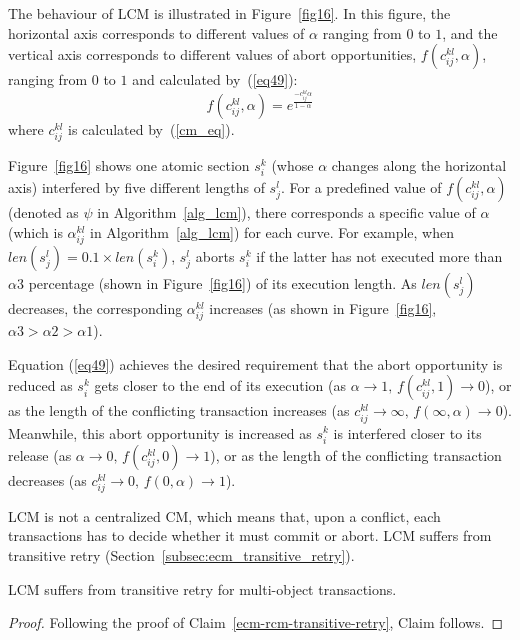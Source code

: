 The behaviour of LCM is illustrated in Figure~\ref{fig16}. In this figure, the horizontal axis corresponds to different values of $\alpha$ ranging from $0$ to $1$, and the vertical axis corresponds to different values of abort opportunities, $f(c_{ij}^{kl},\alpha)$, ranging from $0$ to $1$ and calculated by~(\ref{eq49}):
\begin{equation}
f(c_{ij}^{kl},\alpha)=e^{\frac{-c_{ij}^{kl}\alpha}{1-\alpha}}
\label{eq49}\end{equation}
where $c_{ij}^{kl}$ is calculated by~(\ref{cm_eq}).

Figure~\ref{fig16} shows one atomic section $s_i^k$ (whose $\alpha$ changes along the horizontal axis) interfered by five different lengths of $s_j^l$.
For a predefined value of $f(c_{ij}^{kl},\alpha)$ (denoted as $\psi$ in Algorithm~\ref{alg_lcm}), there corresponds a specific value of $\alpha$ (which is $\alpha_{ij}^{kl}$ in Algorithm~\ref{alg_lcm}) for each curve. For example, when $len(s_j^l)=0.1 \times len(s_i^k)$, $s_j^l$ aborts $s_i^k$ if the latter has not executed more than $\alpha3$ percentage (shown in Figure~\ref{fig16}) of its execution length. As $len(s_{j}^{l})$ decreases, the corresponding $\alpha_{ij}^{kl}$ increases (as shown in Figure~\ref{fig16}, $\alpha3>\alpha2>\alpha1$).

Equation (\ref{eq49}) achieves the desired requirement that the abort opportunity is reduced as $s_{i}^{k}$ gets closer to the end of its execution (as $\alpha\rightarrow1,\, f(c_{ij}^{kl},1)\rightarrow0$),
or as the length of the conflicting transaction increases (as $c_{ij}^{kl}\rightarrow\infty,\, f(\infty,\alpha)\rightarrow0$). Meanwhile, this abort opportunity is increased as $s_{i}^{k}$ is interfered closer to its release (as $\alpha\rightarrow0,\, f(c_{ij}^{kl},0)\rightarrow1$),
or as the length of the conflicting transaction decreases (as $c_{ij}^{kl}\rightarrow0,\, f(0,\alpha)\rightarrow1$).

LCM is not a centralized CM, which means that, upon a conflict, each transactions has to decide whether it must commit or abort. LCM suffers from transitive retry (Section~\ref{subsec:ecm_transitive_retry}).
%
\begin{clm}\label{clm:lcm-transitive-retry}
LCM suffers from transitive retry for multi-object transactions.
\end{clm}
%
\begin{proof}\normalfont
%
Following the proof of Claim~\ref{ecm-rcm-transitive-retry}, Claim follows.
%
\end{proof}
%
